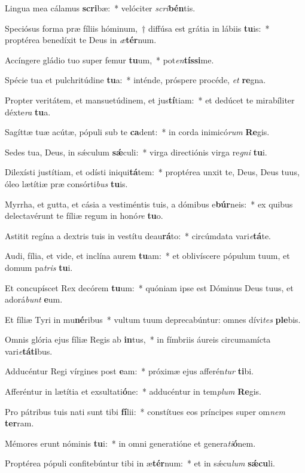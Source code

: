 \item Lingua mea cálamus \textbf{scri}bæ:~* velóciter \textit{scri}\textbf{bén}tis.
\item Speciósus forma præ fíliis hóminum,~† diffúsa est grátia in lábiis \textbf{tu}is:~* proptérea benedíxit te Deus in \textit{æ}\textbf{tér}num.
\item Accíngere gládio tuo super femur \textbf{tu}um,~* pot\textit{en}\textbf{tís}\textbf{si}me.
\item Spécie tua et pulchritúdine \textbf{tu}a:~* inténde, próspere procéde, \textit{et} \textbf{re}gna.
\item Propter veritátem, et mansuetúdinem, et jus\textbf{tí}tiam:~* et dedúcet te mirabíliter déxte\textit{ra} \textbf{tu}a.
\item Sagíttæ tuæ acútæ, pópuli sub te \textbf{ca}dent:~* in corda inimicó\textit{rum} \textbf{Re}gis.
\item Sedes tua, Deus, in sǽculum \textbf{sǽ}culi:~* virga directiónis virga re\textit{gni} \textbf{tu}i.
\item Dilexísti justítiam, et odísti iniqui\textbf{tá}tem:~* proptérea unxit te, Deus, Deus tuus, óleo lætítiæ præ consórti\textit{bus} \textbf{tu}is.
\item Myrrha, et gutta, et cásia a vestiméntis tuis, a dómibus e\textbf{búr}neis:~* ex quibus delectavérunt te fíliæ regum in honó\textit{re} \textbf{tu}o.
\item Astitit regína a dextris tuis in vestítu deau\textbf{rá}to:~* circúmdata vari\textit{e}\textbf{tá}te.
\item Audi, fília, et vide, et inclína aurem \textbf{tu}am:~* et oblivíscere pópulum tuum, et domum pa\textit{tris} \textbf{tu}i.
\item Et concupíscet Rex decórem \textbf{tu}um:~* quóniam ipse est Dóminus Deus tuus, et adorá\textit{bunt} \textbf{e}um.
\item Et fíliæ Tyri in mu\textbf{né}ribus~* vultum tuum deprecabúntur: omnes dívi\textit{tes} \textbf{ple}bis.
\item Omnis glória ejus fíliæ Regis ab \textbf{in}tus,~* in fímbriis áureis circumamícta vari\textit{e}\textbf{tá}\textbf{ti}bus.
\item Adducéntur Regi vírgines post \textbf{e}am:~* próximæ ejus afferén\textit{tur} \textbf{ti}bi.
\item Afferéntur in lætítia et exsultati\textbf{ó}ne:~* adducéntur in tem\textit{plum} \textbf{Re}gis.
\item Pro pátribus tuis nati sunt tibi \textbf{fí}lii:~* constítues eos príncipes super om\textit{nem} \textbf{ter}ram.
\item Mémores erunt nóminis \textbf{tu}i:~* in omni generatióne et genera\textit{ti}\textbf{ó}nem.
\item Proptérea pópuli confitebúntur tibi in æ\textbf{tér}num:~* et in sǽcu\textit{lum} \textbf{sǽ}\textbf{cu}li.
